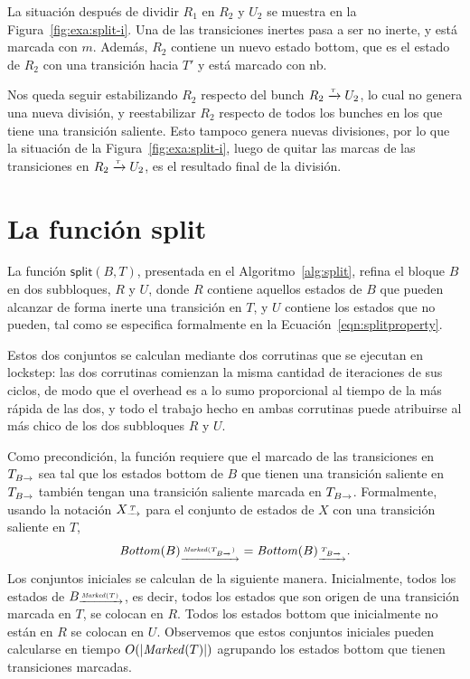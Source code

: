\begin{example}
La situación después de dividir $R_1$ en $R_2$ y $U_2$ se muestra en la Figura~\ref{fig:exa:split-i}.
Una de las transiciones inertes pasa a ser no inerte, y está marcada con {\color{red}$m$}.
Además, $R_2$ contiene un nuevo estado bottom, que es el estado de $R_2$ con una transición hacia $T'$ y está marcado con nb.

Nos queda seguir estabilizando $R_2$ respecto del bunch $R_2 \pijl{\tau} U_2$,
lo cual no genera una nueva división,
y reestabilizar $R_2$ respecto de todos los bunches en los que tiene una transición saliente.
Esto tampoco genera nuevas divisiones, por lo que la situación de la Figura~\ref{fig:exa:split-i},
luego de quitar las marcas de las transiciones en $R_2 \pijl{\tau} U_2$,
es el resultado final de la división.
\end{example}


\section{La función split}
\label{sec:splitting_blocks}

La función $\mathsf{split}(B,T)$, presentada en el Algoritmo~\ref{alg:split}, refina el bloque $B$ en dos subbloques, $R$ y $U$,
donde $R$ contiene aquellos estados de $B$ que pueden alcanzar de forma inerte una transición en $T$,
y $U$ contiene los estados que no pueden,
tal como se especifica formalmente en la Ecuación~\eqref{eqn:splitproperty}.

Estos dos conjuntos se calculan mediante dos corrutinas que se ejecutan en lockstep:
las dos corrutinas comienzan la misma cantidad de iteraciones de sus ciclos,
de modo que el overhead es a lo sumo proporcional al tiempo de la más rápida de las dos,
y todo el trabajo hecho en ambas corrutinas puede atribuirse al más chico de los dos subbloques $R$ y $U$.

Como precondición,
la función requiere que el marcado de las transiciones en $\TB$ sea tal
que los estados bottom de $B$ que tienen una transición saliente en $\TB$ también tengan una transición saliente marcada en $\TB$.
Formalmente, usando la notación $X_{\pijl{T}}$ para el conjunto de estados de $X$ con una transición saliente en $T$,
\begin{equation*}
\Bottom(B)_{\pijl{\Marked(\TB)}} = \Bottom(B)_{\pijl{\TB}}.
\end{equation*}
Los conjuntos iniciales se calculan de la siguiente manera.
Inicialmente, todos los estados de $B_{\pijl{\Marked(T)}}$,
es decir, todos los estados que son origen de una transición marcada en $T$, se colocan en $R$.
Todos los estados bottom que inicialmente no están en $R$ se colocan en $U$.
Observemos que estos conjuntos iniciales pueden calcularse en tiempo ${O\!\left(\left\lvert \mathit{Marked}(T) \right\rvert\right)}$
agrupando los estados bottom que tienen transiciones marcadas.

